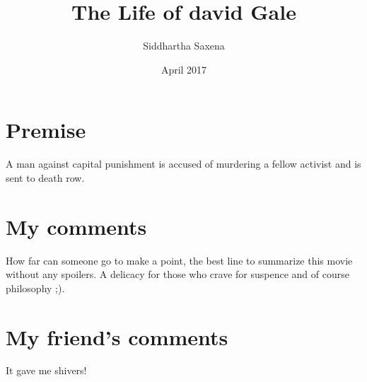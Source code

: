 \documentclass{article}
\title{The Life of david Gale}
\author{Siddhartha Saxena}
\date{April 2017}
\begin{document}
\maketitle

\section{Premise}
A man against capital punishment is accused of murdering a fellow activist and is sent to death row.
\section{My comments}
How far can someone go to make a point, the best line to summarize this movie without any spoilers. A delicacy for those who crave for suspence and of course philosophy ;). 
\section{My friend's comments}
It gave me shivers!
\end{document}
